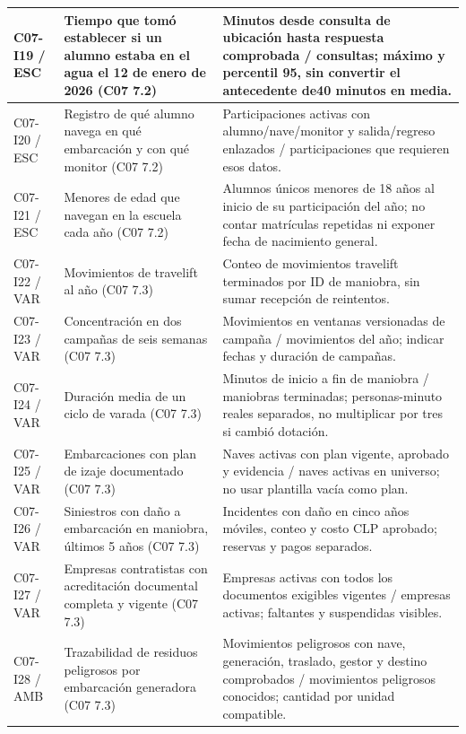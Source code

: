 \begin{longtable}{@{}L{.12\linewidth}L{.32\linewidth}L{\dimexpr.56\tabcolsep\relax}@{}}
C07-I19 / ESC & Tiempo que tomó establecer si un alumno estaba en el agua el 12 de enero de 2026 (C07 7.2) & Minutos desde consulta de ubicación hasta respuesta comprobada /\allowbreak{} consultas; máximo y percentil 95, sin convertir el antecedente de40 minutos en media. \\ \hline
C07-I20 / ESC & Registro de qué alumno navega en qué embarcación y con qué monitor (C07 7.2) & Participaciones activas con alumno/\allowbreak{}nave/\allowbreak{}monitor y salida/\allowbreak{}regreso enlazados /\allowbreak{} participaciones que requieren esos datos. \\ \hline
C07-I21 / ESC & Menores de edad que navegan en la escuela cada año (C07 7.2) & Alumnos únicos menores de 18 años al inicio de su participación del año; no contar matrículas repetidas ni exponer fecha de nacimiento general. \\ \hline
C07-I22 / VAR & Movimientos de travelift al año (C07 7.3) & Conteo de movimientos travelift terminados por ID de maniobra, sin sumar recepción de reintentos. \\ \hline
C07-I23 / VAR & Concentración en dos campañas de seis semanas (C07 7.3) & Movimientos en ventanas versionadas de campaña /\allowbreak{} movimientos del año; indicar fechas y duración de campañas. \\ \hline
C07-I24 / VAR & Duración media de un ciclo de varada (C07 7.3) & Minutos de inicio a fin de maniobra /\allowbreak{} maniobras terminadas; personas-minuto reales separados, no multiplicar por tres si cambió dotación. \\ \hline
C07-I25 / VAR & Embarcaciones con plan de izaje documentado (C07 7.3) & Naves activas con plan vigente, aprobado y evidencia /\allowbreak{} naves activas en universo; no usar plantilla vacía como plan. \\ \hline
C07-I26 / VAR & Siniestros con daño a embarcación en maniobra, últimos 5 años (C07 7.3) & Incidentes con daño en cinco años móviles, conteo y costo CLP aprobado; reservas y pagos separados. \\ \hline
C07-I27 / VAR & Empresas contratistas con acreditación documental completa y vigente (C07 7.3) & Empresas activas con todos los documentos exigibles vigentes /\allowbreak{} empresas activas; faltantes y suspendidas visibles. \\ \hline
C07-I28 / AMB & Trazabilidad de residuos peligrosos por embarcación generadora (C07 7.3) & Movimientos peligrosos con nave, generación, traslado, gestor y destino comprobados /\allowbreak{} movimientos peligrosos conocidos; cantidad por unidad compatible. \\ \hline

\end{longtable}
